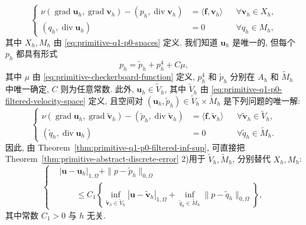 \begin{equation*}
\tag{3.26}\label{eq:primitive-q1-p0-discrete-system-source-number}
\left\{
\begin{aligned}
\nu(\operatorname{grad}\mathbf u_h,\operatorname{grad}\mathbf v_h)
-(p_h,\operatorname{div}\mathbf v_h)
&=\langle\mathbf f,\mathbf v_h\rangle
&&\forall\mathbf v_h\in X_h,\\
(q_h,\operatorname{div}\mathbf u_h)&=0
&&\forall q_h\in M_h,
\end{aligned}
\right.
\end{equation*}
其中 $X_h,M_h$ 由 \eqref{eq:primitive-q1-p0-spaces} 定义.
我们知道 $\mathbf u_h$ 是唯一的, 但每个 $p_h$ 都具有形式
\[
p_h=\tilde p_h+p_h^4+C\mu,
\]
其中 $\mu$ 由 \eqref{eq:primitive-checkerboard-function} 定义,
$p_h^4$ 和 $\tilde p_h$ 分别在 $A_h$ 和 $\widetilde M_h$ 中唯一确定,
$C$ 则为任意常数. 此外, $\mathbf u_h\in\widetilde V_h$,
其中 $\widetilde V_h$ 由 \eqref{eq:primitive-q1-p0-filtered-velocity-space} 定义,
且空间对 $(\mathbf u_h,\tilde p_h)\in\widetilde V_h\times\widetilde M_h$
是下列问题的唯一解:
\setcounter{equation}{36}
\begin{equation}\label{eq:primitive-q1-p0-filtered-discrete-system}
\left\{
\begin{aligned}
\nu(\operatorname{grad}\mathbf u_h,\operatorname{grad}\tilde{\mathbf v}_h)
-(\tilde p_h,\operatorname{div}\tilde{\mathbf v}_h)
&=\langle\mathbf f,\tilde{\mathbf v}_h\rangle
&&\forall\tilde{\mathbf v}_h\in\widetilde V_h,\\
(\tilde q_h,\operatorname{div}\mathbf u_h)&=0
&&\forall\tilde q_h\in\widetilde M_h.
\end{aligned}
\right.
\end{equation}
因此, 由 Theorem~\ref{thm:primitive-q1-p0-filtered-inf-sup},
可直接把 Theorem~\ref{thm:primitive-abstract-discrete-error} 2)用于
$\widetilde V_h,\widetilde M_h$, 分别替代 $X_h,M_h$:
\begin{equation}\label{eq:primitive-q1-p0-quasi-optimal-error}
\left\{
\begin{aligned}
&|\mathbf u-\mathbf u_h|_{1,\Omega}
+\|p-\tilde p_h\|_{0,\Omega}\\
&\qquad\leq C_1\left\{
\inf_{\tilde{\mathbf v}_h\in\widetilde V_h}
|\mathbf u-\tilde{\mathbf v}_h|_{1,\Omega}
+\inf_{\tilde q_h\in\widetilde M_h}
\|p-\tilde q_h\|_{0,\Omega}\right\},
\end{aligned}
\right.
\end{equation}
其中常数 $C_1>0$ 与 $h$ 无关.

